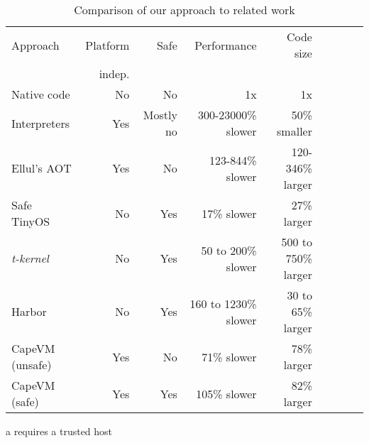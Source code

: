 
\begin{table}
\caption{Comparison of our approach to related work}
\label{tbl-contribution-comparison}
    \begin{threeparttable}
    \begin{tabular}{lrrrrrrrr}
    \toprule
    Approach        & Platform    & Safe               & Performance           & Code size              \\
                    & indep.      &                    &                       & \\
    \midrule
    \midrule
    Native code     & No          & No                 & 1x                    & 1x                     \\
    Interpreters    & Yes         & Mostly no          & 300-23000\% slower    & ~50\% smaller          \\
    Ellul's AOT     & Yes         & No                 & 123-844\% slower      & 120-346\% larger       \\
    Safe TinyOS     & No          & Yes\tnote{a}       & 17\% slower           & 27\% larger            \\
    \emph{t-kernel} & No          & Yes                & 50 to 200\% slower    & 500 to 750\% larger    \\
    Harbor          & No          & Yes                & 160 to 1230\% slower  & 30 to 65\% larger      \\
    CapeVM (unsafe) & Yes         & No                 & 71\% slower           & 78\% larger            \\ %
    CapeVM (safe)   & Yes         & Yes                & 105\% slower          & 82\% larger            \\ %
    \bottomrule
    \end{tabular}
    \begin{tablenotes}
        \item[a] requires a trusted host
    \end{tablenotes}
    \end{threeparttable}
\end{table}
